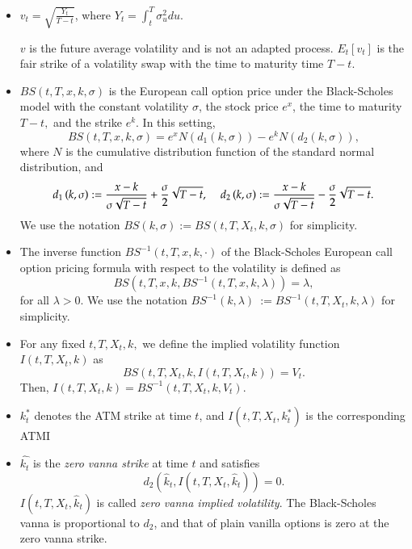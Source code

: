 \documentclass[11pt]{article}
\begin{document}
\begin{itemize}
\item $v_t=\sqrt{\frac{Y_t}{T-t}}$, where $Y_t=\int_{t}^{T}\sigma _{u}^{2}du$.

$v$ is the future average volatility and is not an adapted process. 
$E_{t}\left[
v_{t}\right] $ is the fair strike of a volatility swap with the time to maturity time $T-t$.

\item $BS(t,T,x,k,\sigma )$ is the European call option price under the Black-Scholes model with the constant volatility $\sigma $,
the stock price $e^x$, the time to maturity $T-t,$ and the strike $e^k $. 
In this setting,
\[
BS(t,T,x,k,\sigma )=e^{x}N(d_1(k,\sigma ))-e^{k}N(d_2(k,\sigma )), 
\]%
where $N$ is the cumulative distribution function of the standard normal distribution, and
\[
d_1\left( k,\sigma \right) :=\frac{x-k}{\sigma \sqrt{T-t}}+
\frac{\sigma }{2}\sqrt{T-t},  \hspace{0.4cm} d_2\left( k,\sigma \right) :=\frac{x-k}{\sigma \sqrt{T-t}}-
\frac{\sigma }{2}\sqrt{T-t}.
\]%
We use the notation $BS(k,\sigma):=BS(t,T,X_t,k,\sigma )$ for simplicity.
\item  The inverse function $BS^{-1}(t,T,x,k, \cdot)$ of the Black-Scholes European call option pricing formula with respect to the volatility is defined as
\[
BS(t,T,x,k, BS^{-1}( t,T,x,k,\lambda) )=\lambda,
\]
for all $\lambda>0$.
We use the notation $BS^{-1}(k,\lambda)\ :=BS^{-1}(t,T,X_{t},k,\lambda)$ for simplicity.

\item For any fixed $t,T,X_{t},k,$ we define the implied volatility function $I(t,T,X_{t},k) $ as
\[
BS( t,T,X_{t},k,I( t,T,X_{t},k) ) =V_{t}.
\]
Then, $I(t,T,X_t,k)=BS^{-1}( t,T,X_t,k,V_t)$.

\item $k_t^*$ denotes the ATM strike at time $t$, and $I(t,T,X_t,k_t^*)$ is the corresponding ATMI

\item $\hat{k_t}$ is the {\it zero vanna strike} at time $t$ and satisfies $$d_2(\hat{k}_t,I(t,T,X_t,\hat{k}_t))=0.$$ 
$I(t,T,X_t,\hat{k}_t)$ is called {\it zero vanna implied volatility}. The Black-Scholes vanna is proportional to $d_2$, and that of plain vanilla options is zero at the zero vanna strike.
\end{itemize}
\end{document}

